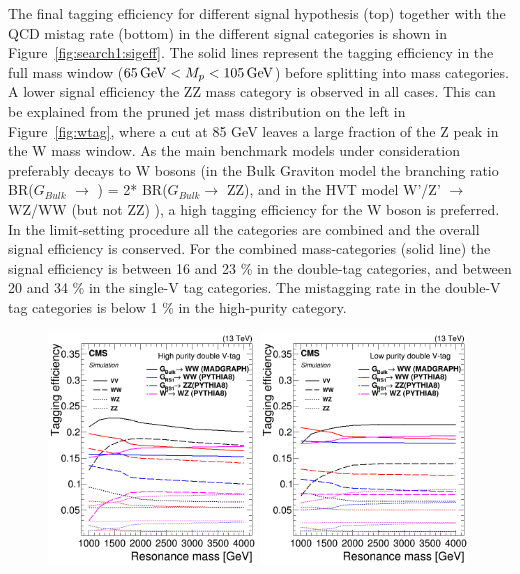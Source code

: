 The final tagging efficiency for different signal hypothesis (top) together with the QCD mistag rate (bottom) in the different signal categories is shown in Figure~\ref{fig:search1:sigeff}. The solid lines represent the tagging efficiency in the full mass window ($65 {\,\text{Ge\hspace{-.08em}V}} < M_{p} < 105 {\,\text{Ge\hspace{-.08em}V}}$) before splitting into mass categories. A lower signal efficiency the ZZ mass category is observed in all cases. This can be explained from the pruned jet mass distribution on the left in Figure~\ref{fig:wtag}, where a cut at 85 GeV leaves a large fraction of the Z peak in the W mass window. As the main benchmark models under consideration preferably decays to W bosons (in the Bulk Graviton model the branching ratio BR($G_{Bulk}$ $\rightarrow$ \PW\PW) = 2* BR($G_{Bulk}$$\rightarrow$ ZZ), and in the HVT model W'/Z' $\rightarrow$ WZ/WW (but not ZZ) ), a high tagging efficiency for the W boson is preferred. In the limit-setting procedure all the categories are combined and the overall signal efficiency is conserved. For the combined mass-categories (solid line) the signal efficiency is between 16 and 23 \% in the double-tag categories, and between 20 and 34 \% in the single-V tag categories. The mistagging rate in the double-V tag categories is below 1 \% in the high-purity category.
\begin{figure}[h!]
\centering
\includegraphics[width=0.49\textwidth]{figures/analysis/search1/AN-15-211/HP_VV_SigEff.png}
\includegraphics[width=0.49\textwidth]{figures/analysis/search1/AN-15-211/LP_VV_SigEff.png}\\

\end{figure}$$
